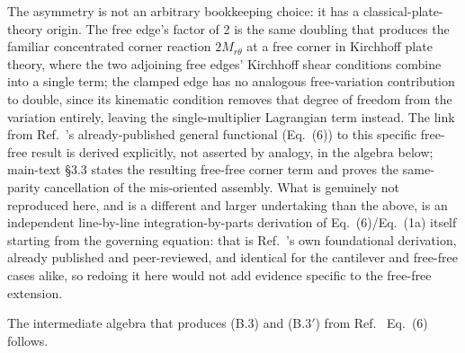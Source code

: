 \documentclass[11pt]{article}
\begin{document}
The asymmetry is not an arbitrary bookkeeping choice: it has a classical-plate-theory origin. The free edge's factor of 2 is the same
doubling that produces the familiar concentrated corner reaction
$2M_{r\theta}$ at a free corner in Kirchhoff plate theory, where the two
adjoining free edges' Kirchhoff shear conditions combine into a single
term; the clamped edge has no analogous free-variation contribution to
double, since its kinematic condition removes that degree of freedom from
the variation entirely, leaving the single-multiplier Lagrangian term
instead. The link from
Ref.~\cite{seok1}'s already-published general functional (Eq.~(6)) to this
specific free-free result is derived explicitly, not asserted by analogy,
in the algebra below; main-text \S3.3 states the resulting free-free
corner term and proves the same-parity cancellation of the mis-oriented
assembly. What is genuinely not
reproduced here, and is a different and larger undertaking than the above,
is an independent line-by-line integration-by-parts derivation of
Eq.~(6)/Eq.~(1a) itself starting from the governing equation: that is
Ref.~\cite{seok1}'s own foundational derivation, already published and
peer-reviewed, and identical for the cantilever and free-free cases alike,
so redoing it here would not add evidence specific to the free-free
extension.

The intermediate algebra that produces (B.3) and (B.3$'$) from
Ref.~\cite{seok1} Eq.~(6) follows.
\end{document}
